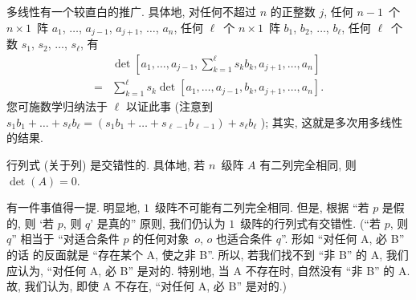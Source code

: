 多线性有一个较直白的推广.
具体地,
对任何不超过 \(n\) 的正整数 \(j\),
任何 \(n-1\)~个 \(n \times 1\)~阵
\(a_1\), \(\dots\), \(a_{j-1}\),
\(a_{j+1}\), \(\dots\), \(a_n\),
任何 \(\ell\)~个 \(n \times 1\)~阵
\(b_1\), \(b_2\), \(\dots\), \(b_\ell\),
任何 \(\ell\)~个数
\(s_1\), \(s_2\), \(\dots\), \(s_\ell\),
有
\begin{align*}
         & \det
    {\left[
            a_1, \dots, a_{j-1},
            \sum_{k = 1}^{\ell} {s_k b_k},
            a_{j+1}, \dots, a_n
            \right]}
    \\
    = {} &
    \sum_{k = 1}^{\ell}
    {s_k
    \det {[a_1, \dots, a_{j-1},
                b_k,
                a_{j+1}, \dots, a_n]}}.
\end{align*}
您可施数学归纳法于 \(\ell\) 以证此事
(注意到
\(
s_1 b_1 + \dots + s_\ell b_\ell
= (s_1 b_1 + \dots + s_{\ell-1} b_{\ell-1}) + s_\ell b_\ell
\)%
);
其实, 这就是多次用多线性的结果.

\begin{theorem}[交错性]
    行列式 (关于列) 是交错性的.
    具体地,
    若 \(n\)~级阵 \(A\) 有二列完全相同,
    则 \(\det {(A)} = 0\).
\end{theorem}

有一件事值得一提.
明显地, \(1\)~级阵不可能有二列完全相同.
但是,
根据
``若 \(p\) 是假的, 则 `若 \(p\), 则 \(q\)' 是真的''
原则,
我们仍认为 \(1\)~级阵的行列式有交错性.
(``若 \(p\), 则 \(q\)''
相当于
``对适合条件 \(p\) 的任何对象~\(o\),
\(o\) 也适合条件 \(q\)''.
形如 ``对任何 A, 必 B'' 的话%
的反面就是 ``存在某个 A, 使之非 B''.
所以, 若我们找不到 ``非 B'' 的 A,
我们应认为, ``对任何 A, 必 B'' 是对的.
特别地, 当 A 不存在时, 自然没有 ``非 B'' 的 A.
故, 我们认为, 即使 A 不存在,
``对任何 A, 必 B'' 是对的.)

